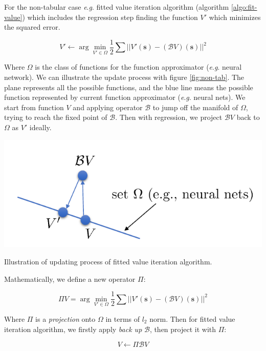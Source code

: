 \documentclass{tufte-handout}
\newcommand{\eg}{\textit{e}.\textit{g}. }
\newcommand{\s}{\mathbf{s}}
\begin{document}
For the non-tabular case \eg fitted value iteration algorithm (algorithm \ref{algo:fit-value}) which includes the regression step finding the function $V'$ which minimizes the squared error.

\begin{equation}
\label{eq:19}
V' \leftarrow \arg \min _{V' \in \Omega} \frac{1}{2} \sum \big | \big| V'(\s) - (\mathcal{B}V)(\s) \big|\big|^2
\end{equation}

Where $\Omega$ is the class of functions for the function approximator (\eg neural network). We can illustrate the update process with figure
\ref{fig:non-tab}. The plane represents all the possible functions, and the blue line means the possible function represented by current function approximator (\eg neural nets).
We start from function $V$ and applying operator $\mathcal{B}$ to jump off the manifold of $\Omega$, trying to reach the fixed point of $\mathcal{B}$.
Then with regression, we project $\mathcal{B}V$ back to $\Omega$ as $V'$ ideally.

\begin{marginfigure}
\centering
\includegraphics[width=\linewidth]{non-tab}
\caption{Illustration of updating process of fitted value iteration algorithm.}
\label{fig:non-tab}
\end{marginfigure}

Mathematically, we define a new operator $\Pi$:

\begin{equation}
\label{eq:20}
\Pi V = \arg \min _{V' \in \Omega} \frac{1}{2} \sum \big | \big| V'(\s) - (\mathcal{B}V)(\s) \big|\big|^2
\end{equation}

Where $\Pi$ is a \emph{projection} onto $\Omega$ in terms of $l_2$ norm. Then for fitted value iteration algorithm, we firstly apply \emph{back up} $\mathcal{B}$, then project it with $\Pi$:

\begin{equation}
\label{eq:21}
V \leftarrow \Pi \mathcal{B} V
\end{equation}
\end{document}
